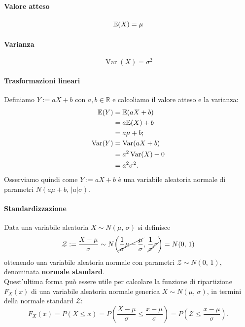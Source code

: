 \paragraph{Valore atteso}
$$
\mathbb{E}(X) = \mu
$$

\paragraph{Varianza}
$$
\operatorname{Var}(X) = \sigma^2
$$

\paragraph{Trasformazioni lineari}
Definiamo $Y := aX + b$ con $a,b \in \mathbb R$ e calcoliamo il valore atteso e la varianza:
\begin{align*}
    \mathbb{E}(Y) &= \mathbb{E}(aX + b) \\
    &= a \mathbb{E}(X) + b \\ 
    &= a\mu + b; \\
    \operatorname{Var}(Y) &= \operatorname{Var}(aX + b) \\ 
    &= a^2 \operatorname{Var}(X) + 0 \\ 
    &= a^2 \sigma^2.
\end{align*}
Osserviamo quindi come $Y := aX + b$ è una variabile aleatoria normale di parametri $N{(a\mu + b, \, |a|\sigma)}$.

\paragraph{Standardizzazione}
Data una variabile aleatoria $X \sim N(\mu, \, \sigma)$ si definisce \[
\mathcal Z := \displaystyle \frac{X - \mu}{\sigma} \sim N{\displaystyle \left (\cancel{\frac{1}{\sigma} \mu - \frac{\mu}{\sigma}}, \, {\frac{1}{\cancel \sigma} \cancel \sigma} \right )} = N{(0, \, 1)} 
\] ottenendo una variabile aleatoria normale con parametri $\mathcal Z \sim N{(0, \, 1)}$, denominata \textbf{normale standard}. \\
Quest'ultima forma può essere utile per calcolare la funzione di ripartizione $F_X(x)$ di una variabile aleatoria normale generica $X \sim N{(\mu, \, \sigma)}$, in termini della normale standard $\mathcal Z$:
$$
    F_X(x) = P(X \leq x) = P \left (\frac{X - \mu}{\sigma} \leq \frac{x - \mu}{\sigma} \right ) = P \left (\mathcal Z \leq \frac{x - \mu}{\sigma} \right ) \! \! .
$$


